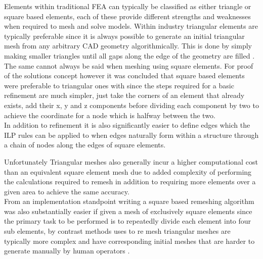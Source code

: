 \noindent
Elements within traditional FEA can typically be classified as either triangle or square based elements, each of these provide different strengths and weaknesses when required to mesh and solve models. Within industry triangular elements are typically preferable since it is always possible to generate an initial triangular mesh from any arbitrary CAD geometry algorithmically. This is done by simply making smaller triangles until all gaps along the edge of the geometry are filled \cite{DelaunyTriangles}. The same cannot always be said  when meshing using square elements. For proof of the solutions concept however it was concluded that square based elements were preferable to triangular ones with since the steps required for a basic refinement are much simpler, just take the corners of an element that already exists, add their x, y and z components before dividing each component by two to achieve the coordinate for a node which is halfway between the two. \\ 

\noindent
In addition to refinement it is also significantly easier to define edges which the ILP rules can be applied to when edges naturally form within a structure through a chain of nodes along the edges of square elements.


\noindent
Unfortunately Triangular meshes also generally incur a higher computational cost than an equivalent square element mesh due to added complexity of performing the calculations required to remesh in addition to requiring more elements over a given area to achieve the same accuracy. \\

\noindent
From an implementation standpoint writing a square based remeshing algorithm was also substantially easier if given a mesh of exclusively square elements since the primary task to be performed is to repeatedly divide each element into four sub elements, by contrast methods uses to re mesh triangular meshes are typically more complex and have corresponding initial meshes that are harder to generate manually by human operators \cite{HandMeshing}. \\ 

